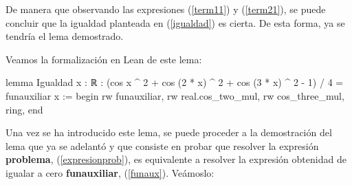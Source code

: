 \begin{demostracion}
De manera que observando las expresiones (\ref{term11}) y (\ref{term21}),
se puede concluir que la igualdad planteada en (\ref{igualdad}) es cierta.
De esta forma, ya se tendría el lema demostrado.
\end{demostracion}

Veamos la formalización en Lean de este lema:
\begin{leancode}
lemma Igualdad {x : ℝ} :
(cos x ^ 2 + cos (2 * x) ^ 2 + cos (3 * x) ^ 2 - 1) / 4 = funauxiliar x :=
begin
  rw funauxiliar,
  rw real.cos_two_mul,
  rw cos_three_mul,
  ring,
end
\end{leancode}

Una vez se ha introducido este lema, se puede proceder a la demostración
del lema que ya se adelantó y que consiste en probar que resolver la
expresión \textbf{problema}, (\ref{expresionprob}), es equivalente a resolver
la expresión obtenidad de igualar a cero \textbf{funauxiliar},
(\ref{funaux}). Veámoslo:


